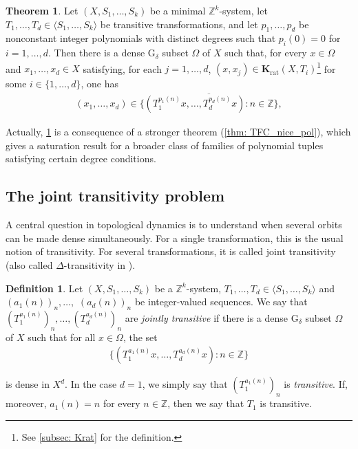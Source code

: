 \documentclass[11pt,reqno]{amsart}
\newcommand{\Z}{\mathbb{Z}}
\newcommand{\Krat}{\mathbf{K}_{\operatorname{rat}}}
\theoremstyle{definition}
\newtheorem{definition}[definition]{Definition}
\newtheorem{maintheorem}{Theorem}
\theoremstyle{remark}
\begin{document}
\begin{maintheorem}\label{thm: TFC_distinct_deg}
    Let $(X,S_1,\dots,S_k)$ be a minimal $\Z^k$-system, let $T_1,\dots,T_d\in \langle S_{1},\dots,S_{k}\rangle$ be transitive transformations, and let $p_1,\dots,p_d$ be nonconstant integer polynomials with distinct degrees such that $p_{i}(0)=0$ for $i=1,\dots, d$. Then there is a dense G$_\delta$ subset $\Omega$ of $X$ such that, for every $x\in \Omega$ and $x_1,\dots,x_d\in X$ satisfying, for each $j=1,\dots,d$, $(x,x_j)\in \Krat(X,T_i)$\footnote{See \cref{subsec: Krat} for the definition.} for some $i\in \{1,\dots,d\}$, one has \begin{align*}
        (x_1,\dots,x_d)\in \overline{\{ (T_1^{p_1(n)}x,\dots,T_d^{p_d(n)}x):n\in\Z \}},
    \end{align*}
\end{maintheorem}

Actually, \cref{thm: TFC_distinct_deg} is a consequence of a stronger theorem (\cref{thm: TFC_nice_pol}), which gives a saturation result for a broader class of families of polynomial tuples satisfying certain degree conditions.

\subsection{The joint transitivity problem}

A central question in topological dynamics is to understand when several orbits can be made dense simultaneously. For a single transformation, this is the usual notion of transitivity. For several transformations, it is called joint transitivity (also called $\Delta$-transitivity in \cite{Huang_Shao_Ye_top_correspondence_multiple_averages:2019}).

\begin{definition}
    Let $(X,S_1,\dots,S_k)$ be a $\Z^k$-system, $T_1,\dots,T_d\in \langle S_1,\dots,S_k\rangle$ and  $(a_1(n))_n, \dots,$ $ (a_d(n))_n$ be integer-valued sequences. We say that $(T_1^{a_1(n)})_n,\dots,(T_d^{a_d(n)})_n$ are \emph{jointly transitive} if there is a dense G$_\delta$ subset $\Omega$ of $X$ such that for all $x\in \Omega$, the set \begin{align*}
        \{(T_1^{a_1(n)}x,\dots,T_d^{a_d(n)}x):n\in \Z\}
    \end{align*}

    is dense in $X^d$. In the case $d=1$, we simply say that $(T_1^{a_1(n)})_n$ is \emph{transitive}. If, moreover, $a_1(n)=n$ for every $n\in\Z$, then we say that $T_1$ is transitive.
\end{definition}
\end{document}
